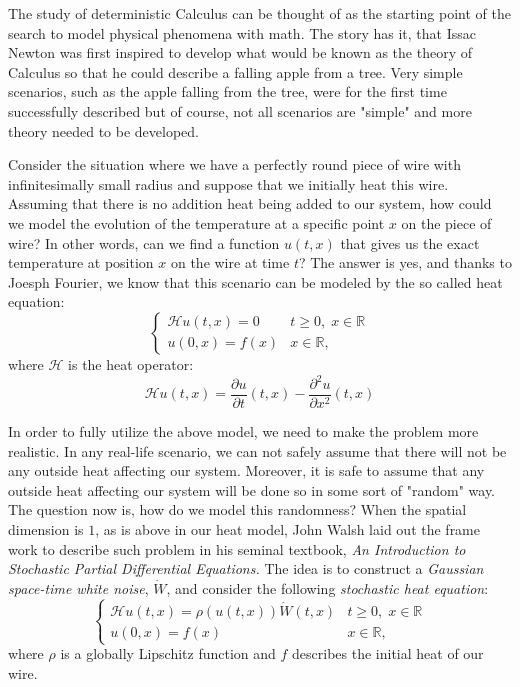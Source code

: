 \documentclass[12pt]{report}
\theoremstyle{plain}
\theoremstyle{definition}
\numberwithin{equation}{section}
\newcommand{\R}{\mathbb{R}}
\begin{document}
The study of deterministic Calculus can be thought of as the starting point of the search to model physical phenomena with math. The story has it, that Issac Newton was first inspired to develop what would be known as the theory of Calculus so that he could describe a falling apple from a tree. Very simple scenarios, such as the apple falling from the tree, were for the first time successfully described but of course, not all scenarios are "simple" and more theory needed to be developed. 

Consider the situation where we have a perfectly round piece of wire with infinitesimally small radius and suppose that we initially heat this wire. Assuming that there is no addition heat being added to our system, how could we model the evolution of the temperature at a specific point $x$ on the piece of wire? In other words, can we find a function $u(t,x)$ that gives us the exact temperature at position $x$ on the wire at time $t$? The answer is yes, and thanks to Joesph Fourier, we know that this scenario can be modeled by the so called heat equation:
	\[
		\begin{cases}
			\mathcal{H}u(t,x) = 0 & t \ge 0, \; x \in \R \\
			u(0,x) = f(x) & x \in \R,
		\end{cases}
	\]
where $\mathcal{H}$ is the heat operator:
	\[
		\mathcal{H}u(t,x) = \frac{\partial u}{\partial t}(t,x) - \frac{\partial^2 u}{\partial x^2}(t,x)
	\]

In order to fully utilize the above model, we need to make the problem more realistic. In any real-life scenario, we can not safely assume that there will not be any outside heat affecting our system. Moreover, it is safe to assume that any outside heat affecting our system will be done so in some sort of "random" way. The question now is, how do we model this randomness? When the spatial dimension is $1$, as is above in our heat model, John Walsh laid out the frame work to describe such problem in his seminal textbook, {\em An Introduction to Stochastic Partial Differential Equations.} The idea is to construct a {\em Gaussian space-time white noise}, $\dot{W}$, and consider the following {\em stochastic heat equation}:
	\begin{equation}\label{E:introSHE}
	\begin{cases}
		\mathcal{H}u(t,x)  = \rho(u(t,x))\dot{W}(t,x) & t \ge 0, \; x \in \R \\
	u(0,x) = f(x) & x \in \R,
	\end{cases}
	\end{equation}
where $\rho$ is a globally Lipschitz function and $f$ describes the initial heat of our wire.
	
\end{document}
